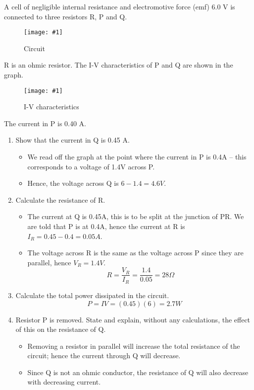 \documentclass[a4paper,12pt]{article}
\newcommand{\img}[4]{\begin{center}
  \begin{figure}[H]
    \centering
    \texttt{[image: \#1]}
    \caption{#3}
    \label{fig:#4}
  \end{figure}
\end{center}}
\begin{document}
A cell of negligible internal resistance and electromotive force (emf) 6.0 V is connected to three resistors R, P and Q.

\img{ex/14.png}{0.5}{Circuit}{ex14}

R is an ohmic resistor. The I-V characteristics of P and Q are shown in the graph.

\img{ex/15.png}{0.5}{I-V characteristics}{ex15}

The current in P is 0.40 A.

\begin{enumerate}[label=(\alph*)]
  \item Show that the current in Q is 0.45 A.
        \begin{itemize}
          \item We read off the graph at the point where the current in P is 0.4A -- this corresponds to a voltage of 1.4V across P.
          \item Hence, the voltage across Q is $6 - 1.4 = 4.6V$.
        \end{itemize}
  \item Calculate the resistance of R.
        \begin{itemize}
          \item The current at Q is 0.45A, this is to be split at the junction of PR. We are told that P is at 0.4A, hence the current at R is $I_R = 0.45 - 0.4 = 0.05A$.
          \item The voltage across R is the same as the voltage across P since they are parallel, hence $V_R = 1.4V$.
                $$R = \frac{V_R}{I_R} = \frac{1.4}{0.05} = 28\Omega$$
        \end{itemize}
  \item Calculate the total power dissipated in the circuit.
        $$ P = IV = (0.45)(6) = 2.7W$$
  \item Resistor P is removed. State and explain, without any calculations, the effect of this on the resistance of Q.

        \begin{itemize}
          \item Removing a resistor in parallel will increase the total resistance of the circuit; hence the current through Q will decrease.
          \item Since Q is not an ohmic conductor, the resistance of Q will also decrease with decreasing current.
        \end{itemize}
\end{enumerate}
\end{document}
